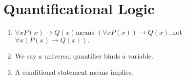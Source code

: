 \documentclass{article}
\begin{document}
    \section{Quantificational Logic}
    \begin{enumerate}
    \item $\forall x P(x) \rightarrow Q(x) $means $(\forall x P(x)) \rightarrow Q(x), $not $\forall x(P(x) \rightarrow Q(x)).$
        \item We say a universal quantifier binds a variable.
            \item A conditional statement means implies.
    \end{enumerate}
\end{document}
